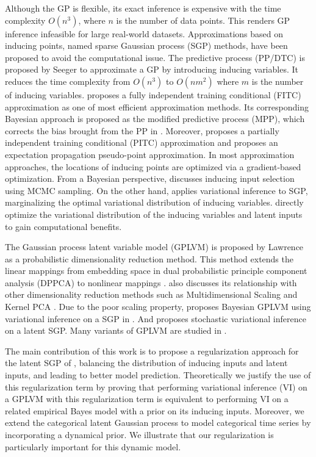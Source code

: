 \documentclass{article}
\begin{document}
Although the GP is flexible, its exact inference is expensive with the time complexity $O(n^3)$, where $n$ is the number of data points. This renders GP inference infeasible for large real-world datasets. Approximations based on inducing points, named sparse Gaussian process (SGP) methods, have been proposed to avoid the computational issue. The predictive process (PP/DTC) is proposed by Seeger \citep{Seeger_2003} to approximate a GP by introducing inducing variables. It reduces the time complexity from $O(n^3)$ to $O(nm^2)$ where $m$ is the number of inducing variables. \cite{Snelson_2006} proposes a fully independent training conditional (FITC) approximation as one of most efficient approximation methods. Its corresponding Bayesian approach is proposed as the modified predictive process (MPP), which corrects the bias brought from the PP in \cite{Finley_2009}. Moreover, \cite{Snelson_2007} proposes a partially independent training conditional (PITC) approximation and \cite{Csato_2002} proposes an expectation propagation pseudo-point approximation. In most approximation approaches, the locations of inducing points are optimized via a gradient-based optimization. From a Bayesian perspective, \cite{Raj_2011} discusses inducing input selection using MCMC sampling. On the other hand, \cite{Titsias_2009} applies variational inference to SGP, marginalizing the optimal variational distribution of inducing variables. \cite{Hensman_2012, Hensman_2013} directly optimize the variational distribution of the inducing variables and latent inputs to gain computational benefits.

The Gaussian process latent variable model (GPLVM) \citep{Lawrence_2003} is proposed by Lawrence as a probabilistic dimensionality reduction method. This method extends the linear mappings from embedding space in dual probabilistic principle component analysis (DPPCA) to nonlinear mappings \citep{Lawrence_2003, Lawrence_2005}. \cite{Lawrence_2005} also discusses its relationship with other dimensionality reduction methods such as Multidimensional Scaling \citep{Mardia_1979} and Kernel PCA \citep{Scholkopf_1998}. Due to the poor scaling property, \cite{Titsias_2010} proposes Bayesian GPLVM using variational inference on a SGP in \cite{Titsias_2009}. And \cite{Hensman_2013} proposes stochastic variational inference on a latent SGP. Many variants of GPLVM are studied in \cite{Lawrence_2007_HGP, Lawrence_2006, Urtasun_2007}.

The main contribution of this work is to propose a regularization approach for the latent SGP of \citep{Hensman_2013}, balancing the distribution of inducing inputs and latent inputs, and leading to better model prediction. Theoretically we justify the use of this regularization term by proving that performing variational inference (VI) on a GPLVM with this regularization term is equivalent to performing VI on a related empirical Bayes model with a prior on its inducing inputs. Moreover, we extend the categorical latent Gaussian process \citep{Gal_2015} to model categorical time series by incorporating a dynamical prior. We illustrate that our regularization is particularly important for this dynamic model.
\end{document}
